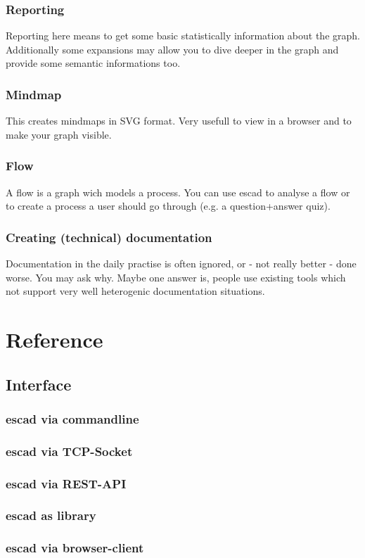 \documentclass[a4paper, 12pt, openany]{scrbook}
\begin{document}
\subsection{Reporting}
Reporting here means to get some basic statistically information about the graph. Additionally some expansions may allow you to dive deeper in the graph and provide some semantic informations too.
\subsection{Mindmap}
This creates mindmaps in SVG format. Very usefull to view in a browser and to make your graph visible.
\subsection{Flow}
A flow is a graph wich models a process. You can use escad to analyse a flow or to create a process a user should go through (e.g. a question+answer quiz).
\subsection{Creating (technical) documentation}
Documentation in the daily practise is often ignored, or - not really better - done worse. You may ask why. Maybe one answer is, people use existing tools which not support very well heterogenic documentation situations.
\chapter{Reference}
\section{Interface}
\subsection{escad via commandline}
\subsection{escad via TCP-Socket}
\subsection{escad via REST-API}
\subsection{escad as library}
\subsection{escad via browser-client}
\end{document}
